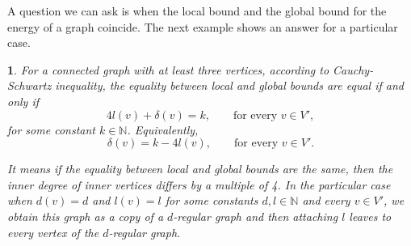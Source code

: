 \documentclass[a4paper]{article}
\newcommand{\N}{\mathbb{N}}
\theoremstyle{plain}
\newtheorem{example}{\protect\exname}
\renewcommand{\exname}{Example}
\renewcommand{\rename}{Remark}%
\renewcommand{\exname}{Ejemplo}\renewcommand{\rename}{Observaci\'on}%
\begin{document}
A question we can ask is when the local bound and the global bound for the energy of a graph coincide. The next example shows an answer for a particular case.

\begin{example}
For a connected graph with at least three vertices, according to Cauchy-Schwartz inequality, the equality between local and global bounds are equal if and only if
\begin{equation}\label{pinatas}
    4l(v) + \delta(v) = k, \qquad \mbox{for every } v \in V',
\end{equation}
for some constant \(k \in \N\). Equivalently,
\[
    \delta(v) = k - 4l(v), \qquad \mbox{for every } v \in V'.
\]

It means if the equality between local and global bounds are the same, then the inner degree of inner vertices differs by a multiple of 4. In the particular case when \(d(v) = d\) and \(l(v) = l\)  for some constants \(d,l \in \N\) and every \(v \in V'\), we obtain this graph as a copy of a \(d\)-regular graph and then attaching \(l\) leaves to every vertex of the \(d\)-regular graph.


\begin{figure}[!htp]
    \centering
    \begin{subfigure}[b]{0.3\textwidth}
        \centering
        \caption{}
    \end{subfigure}%
    \begin{subfigure}[b]{0.3\textwidth}
        \centering
\end{subfigure}
\end{figure}
\end{example}
\end{document}
